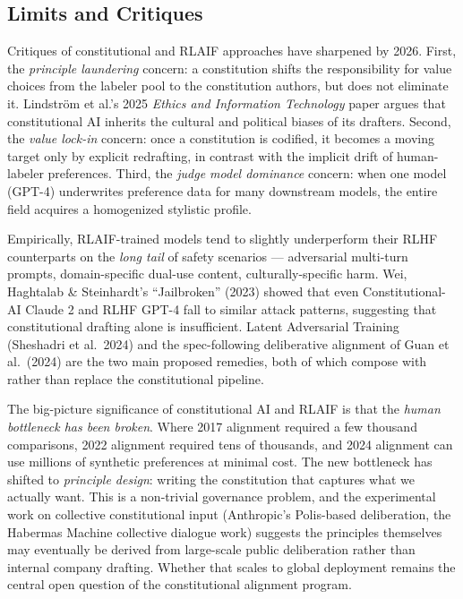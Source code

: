 \subsection{Limits and Critiques}\label{limits-and-critiques}

Critiques of constitutional and RLAIF approaches have sharpened by 2026. First, the \emph{principle laundering} concern: a constitution shifts the responsibility for value choices from the labeler pool to the constitution authors, but does not eliminate it. Lindström et al.'s 2025 \emph{Ethics and Information Technology} paper argues that constitutional AI inherits the cultural and political biases of its drafters. Second, the \emph{value lock-in} concern: once a constitution is codified, it becomes a moving target only by explicit redrafting, in contrast with the implicit drift of human-labeler preferences. Third, the \emph{judge model dominance} concern: when one model (GPT-4) underwrites preference data for many downstream models, the entire field acquires a homogenized stylistic profile.

Empirically, RLAIF-trained models tend to slightly underperform their RLHF counterparts on the \emph{long tail} of safety scenarios --- adversarial multi-turn prompts, domain-specific dual-use content, culturally-specific harm. Wei, Haghtalab \& Steinhardt's ``Jailbroken'' (2023) showed that even Constitutional-AI Claude 2 and RLHF GPT-4 fall to similar attack patterns, suggesting that constitutional drafting alone is insufficient. Latent Adversarial Training (Sheshadri et al.~2024) and the spec-following deliberative alignment of Guan et al.~(2024) are the two main proposed remedies, both of which compose with rather than replace the constitutional pipeline.

The big-picture significance of constitutional AI and RLAIF is that the \emph{human bottleneck has been broken}. Where 2017 alignment required a few thousand comparisons, 2022 alignment required tens of thousands, and 2024 alignment can use millions of synthetic preferences at minimal cost. The new bottleneck has shifted to \emph{principle design}: writing the constitution that captures what we actually want. This is a non-trivial governance problem, and the experimental work on collective constitutional input (Anthropic's Polis-based deliberation, the Habermas Machine collective dialogue work) suggests the principles themselves may eventually be derived from large-scale public deliberation rather than internal company drafting. Whether that scales to global deployment remains the central open question of the constitutional alignment program.

